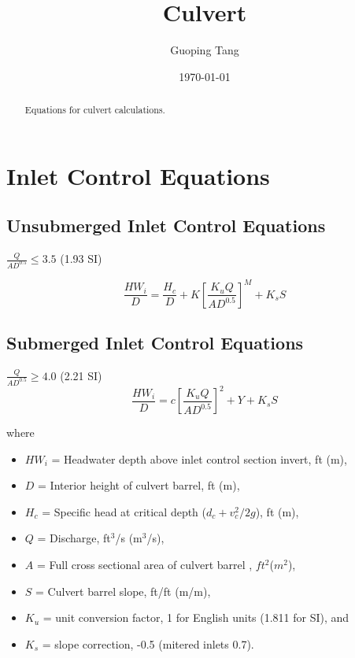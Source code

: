\documentclass[12pt, a4paper]{article}
\title{Culvert}
\author{Guoping Tang}
\date\today{}
\begin{document}
\maketitle

\begin{abstract}
Equations for culvert calculations.
\end{abstract}

\section{Inlet Control Equations}
\subsection{Unsubmerged Inlet Control Equations}

$\frac{Q}{AD^{0.5}} \leq 3.5$ (1.93 SI)

\begin{equation}
\frac{HW_i}{D} = \frac{H_c}{D} + K\left[\frac{K_u Q}{AD^{0.5}}  \right]^M + K_sS
\end{equation}

\subsection{Submerged Inlet Control Equations}
$\frac{Q}{AD^{0.5}} \geq 4.0$ (2.21 SI)
\begin{equation}
\frac{HW_i}{D} = c\left[\frac{K_u Q}{AD^{0.5}}  \right]^2 +Y +  K_sS
\end{equation}

where
\begin{itemize}
\item[] $HW_i$ = Headwater depth above inlet control section invert, ft (m),
\item[] $D$ = Interior height of culvert barrel, ft (m),
\item[] $H_c$ = Specific head at critical depth ($d_c + v_c^2/2g$), ft (m),
\item[] $Q$ = Discharge, ft$^3$/s (m$^3$/s),
\item [] $A$ = Full cross sectional area of culvert barrel , $ft^2$($m^2$),
\item[] $S$ = Culvert barrel slope, ft/ft (m/m),
\item[] $K_u$ = unit conversion factor, 1 for English units (1.811 for SI), and
\item[] $K_s$ = slope correction, -0.5 (mitered inlets 0.7).
\end{itemize}
\end{document}
